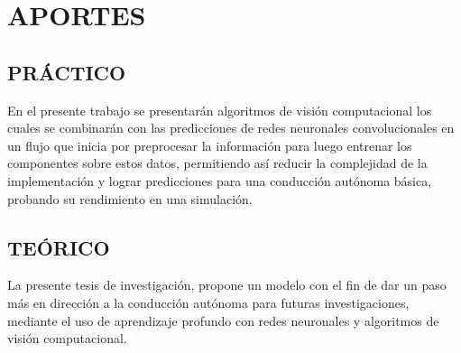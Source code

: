 \section{APORTES}%
	\subsection{PRÁCTICO}
    En el presente trabajo se presentarán algoritmos de visión computacional los cuales se combinarán con las predicciones de redes neuronales convolucionales en un flujo que inicia por preprocesar la información para luego entrenar los componentes sobre estos datos, permitiendo así reducir la complejidad de la implementación y lograr predicciones para una conducción autónoma básica, probando su rendimiento en una simulación.
    \subsection{TEÓRICO}
    La presente tesis de investigación, propone un modelo con el fin de dar un paso más en dirección a la conducción autónoma para futuras investigaciones, mediante el uso de aprendizaje profundo con redes neuronales y algoritmos de visión computacional.